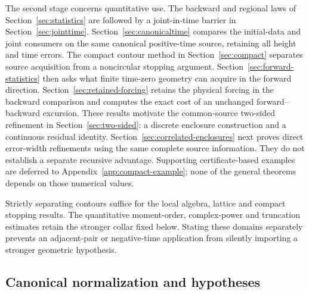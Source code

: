The second stage concerns quantitative use. The backward and regional
laws of Section~\ref{sec:statistics} are followed by a joint-in-time
barrier in Section~\ref{sec:jointtime}. Section~\ref{sec:canonicaltime}
compares the initial-data and joint consumers on the same canonical
positive-time source, retaining all height and time errors. The compact
contour method in Section~\ref{sec:compact} separates source acquisition
from a noncircular stopping argument. Section~\ref{sec:forward-statistics}
then asks what finite time-zero geometry can acquire in the forward
direction. Section~\ref{sec:retained-forcing} retains the physical forcing
in the backward comparison and computes the exact cost of an unchanged
forward--backward excursion. These results motivate the common-source
two-sided refinement in Section~\ref{sec:two-sided}: a discrete enclosure
construction and a continuous residual identity.
Section~\ref{sec:correlated-enclosures} next proves direct error-width
refinements using the same complete source information. They do not
establish a separate recursive advantage. Supporting certificate-based
examples are deferred to Appendix~\ref{app:compact-example}; none of the
general theorems depends on those numerical values.

Strictly separating contours suffice for the local algebra, lattice and
compact stopping results. The quantitative moment-order, complex-power
and truncation estimates retain the stronger collar fixed below. Stating
these domains separately prevents an adjacent-pair or negative-time
application from silently importing a stronger geometric hypothesis.

\subsection{Canonical normalization and hypotheses}

